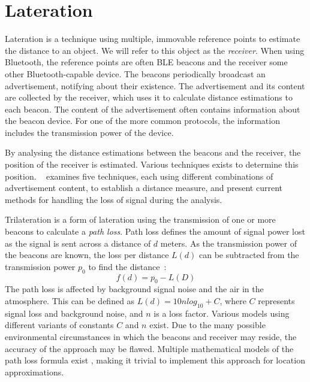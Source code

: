 \section{Lateration}
Lateration is a technique using multiple, immovable reference points to estimate the distance to an object\cite{presence_ble_review}.
We will refer to this object as the \textit{receiver}.
When using Bluetooth, the reference points are often BLE beacons and the receiver some other Bluetooth-capable device. 
The beacons periodically broadcast an advertisement, notifying about their existence.\cite{apple2023ibeacon} 
The advertisement and its content are collected by the receiver, which uses it to calculate distance estimations to each beacon. 
The content of the advertisement often contains information about the beacon device. 
For one of the more common protocols, the information includes the transmission power of the device\cite{apple2023ibeacon}.

By analysing the distance estimations between the beacons and the receiver, the position of the receiver is estimated.
Various techniques exists to determine this position.
\citeauthor{presence_ble_review}~\cite{presence_ble_review} examines five techniques, each using different combinations of advertisement content, to establish a distance measure, and present current methods for handling the loss of signal during the analysis.

Trilateration is a form of lateration using the transmission of one or more beacons to calculate a \textit{path loss}.
Path loss defines the amount of signal power lost as the signal is sent across a distance of $d$ meters.
As the transmission power of the beacons are known, the loss per distance $L(d)$ can be subtracted from the transmission power $p_0$ to find the distance~\cite{taking_localization_to_the_wild}:
\begin{equation}
    f(d) = p_0 - L(D)
\end{equation}
The path loss is affected by background signal noise and the air in the atmosphere.
This can be defined as $L(d) = 10n log_{10}+C$, where $C$ represents signal loss and background noise, and $n$ is a loss factor. \cite{presence_ble_review}
Various models using different variants of constants $C$ and $n$ exist\cite{path_loss_models}.
Due to the many possible environmental circumstances in which the beacons and receiver may reside, the accuracy of the approach may be flawed\cite{presence_ble_review}. 
Multiple mathematical models of the path loss formula exist \cite{rssi_indoor_pos,positioning_alg_rssi, RSSI_ZigBee_distance}, making it trivial to implement this approach for location approximations.